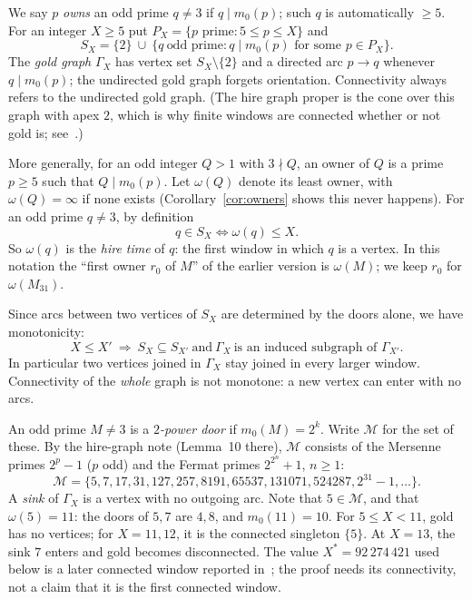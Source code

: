 \documentclass[11pt,a4paper]{article}
\theoremstyle{remark}
\newcommand{\pow}{\mathcal{M}}   %
\begin{document}
We say \(p\) \emph{owns} an odd prime \(q\ne 3\) if \(q\mid m_0(p)\); such \(q\) is automatically \(\ge 5\).
For an integer \(X\ge 5\) put \(P_X=\{p \text{ prime}: 5\le p\le X\}\) and
\[
S_X=\{2\}\ \cup\ \{q\ \text{odd prime}: q\mid m_0(p)\text{ for some }p\in P_X\}.
\]
The \emph{gold graph} \(\Gamma_X\) has vertex set \(S_X\setminus\{2\}\) and a directed arc \(p\to q\) whenever \(q\mid m_0(p)\); the undirected gold graph forgets orientation.
Connectivity always refers to the undirected gold graph.
(The hire graph proper is the cone over this graph with apex \(2\), which is why finite windows are connected whether or not gold is; see~\cite{Hire}.)

More generally, for an odd integer \(Q>1\) with \(3\nmid Q\), an owner of \(Q\) is a prime \(p\ge5\) such that \(Q\mid m_0(p)\).
Let \(\omega(Q)\) denote its least owner, with \(\omega(Q)=\infty\) if none exists (Corollary~\ref{cor:owners} shows this never happens).
For an odd prime \(q\ne3\), by definition
\begin{equation}\label{eq:hire}
q\in S_X\iff \omega(q)\le X .
\end{equation}
So \(\omega(q)\) is the \emph{hire time} of \(q\): the first window in which \(q\) is a vertex.
In this notation the ``first owner \(r_0\) of \(M\)'' of the earlier version is \(\omega(M)\); we keep \(r_0\) for \(\omega(M_{31})\).

Since arcs between two vertices of \(S_X\) are determined by the doors alone, we have monotonicity:
\begin{equation}\label{eq:mono}
X\le X'\ \Longrightarrow\ S_X\subseteq S_{X'}\ \text{and}\ \Gamma_X\ \text{is an induced subgraph of }\Gamma_{X'}.
\end{equation}
In particular two vertices joined in \(\Gamma_X\) stay joined in every larger window.
Connectivity of the \emph{whole} graph is not monotone: a new vertex can enter with no arcs.

An odd prime \(M\ne 3\) is a \emph{\(2\)-power door} if \(m_0(M)=2^k\).
Write \(\pow\) for the set of these.
By the hire-graph note (Lemma~10 there), \(\pow\) consists of the Mersenne primes \(2^p-1\) (\(p\) odd) and the Fermat primes \(2^{2^n}+1\), \(n\ge 1\): 
\[
\pow=\{5,7,17,31,127,257,8191,65537,131071,524287,2^{31}-1,\dots\}.
\]
A \emph{sink} of \(\Gamma_X\) is a vertex with no outgoing arc.
Note that \(5\in\pow\), and that \(\omega(5)=11\): the doors of \(5,7\) are \(4,8\), and \(m_0(11)=10\).
For \(5\le X<11\), gold has no vertices; for \(X=11,12\), it is the connected singleton \(\{5\}\).
At \(X=13\), the sink \(7\) enters and gold becomes disconnected.
The value \(X^*=92\,274\,421\) used below is a later connected window reported in~\cite{Hire}; the proof needs its connectivity, not a claim that it is the first connected window.
\end{document}
